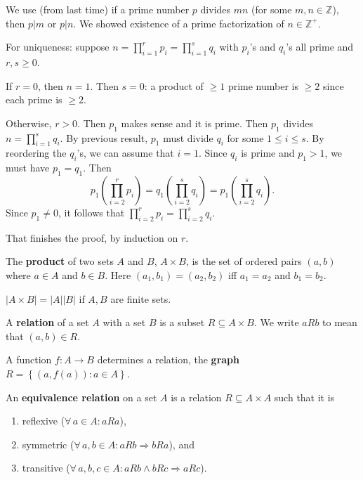 \documentclass{notes}
\begin{document}
\begin{prf}
  We use (from last time) if a prime number $p$ divides $m n$ (for some $m, n \in \mathbb Z$), then $p \vert m$ or $p \vert n$.
  We showed existence of a prime factorization of $n \in \mathbb Z^+$.
  
  For uniqueness: suppose $n = \prod_{i = 1}^r p_i = \prod_{i = 1}^s q_i$ with $p_i$'s and $q_i$'s all prime and $r, s \geq 0$.

  If $r = 0$, then $n = 1$.
  Then $s = 0$: a product of $\geq 1$ prime number is $\geq 2$ since each prime is $\geq 2$.

  Otherwise, $r > 0$.
  Then $p_1$ makes sense and it is prime.
  Then $p_1$ divides $n = \prod_{i = 1}^s q_i$.
  By previous result, $p_1$ must divide $q_i$ for some $1 \leq i \leq s$.
  By reordering the $q_i$'s, we can assume that $i = 1$.
  Since $q_i$ is prime and $p_1 > 1$, we must have $p_1 = q_1$.
  Then 
  \[
    p_1 \left ( \prod_{i = 2}^r p_i \right ) = q_1 \left ( \prod_{i = 2}^s q_i \right ) = p_1 \left ( \prod_{i = 2}^s q_i \right ).
  \]
  Since $p_1 \neq 0$, it follows that $\prod_{i = 2}^r p_i = \prod_{i = 2}^s q_i$.

  That finishes the proof, by induction on $r$.
\end{prf}

\underline{}

\begin{defn}
  The {\boldmath \bfseries product} of two sets $A$ and $B$, $A \times B$, is the set of ordered pairs $(a, b)$ where $a \in A$ and $b \in B$.
  Here $(a_1, b_1) = (a_2, b_2)$ iff $a_1 = a_2$ and $b_1 = b_2$.

  $\left | A \times B \right | = \left | A \right | \left | B \right |$ if $A, B$ are finite sets.
\end{defn}

\begin{defn}
  A {\boldmath \bfseries relation} of a set $A$ with a set $B$ is a subset $R \subseteq A \times B$.
  We write $a R b$ to mean that $(a, b) \in R$.
\end{defn}

\begin{eg}
  A function $f \colon A \to B$ determines a relation, the {\boldmath \bfseries graph} $R = \left \{ (a, f(a)) : a \in A \right \}$.
\end{eg}

\begin{defn}
  An {\boldmath \bfseries equivalence relation} on a set $A$ is a relation $R \subseteq A \times A$ such that it is
  \begin{enumerate}
    \item reflexive ($\forall \, a \in A: a R a$), 

    \item symmetric ($\forall \, a, b \in A: a R b \Rightarrow b R a$), and 

    \item transitive ($\forall \, a, b, c \in A: a R b \wedge b R c \Rightarrow a R c$).
  \end{enumerate}
\end{defn}
\end{document}
